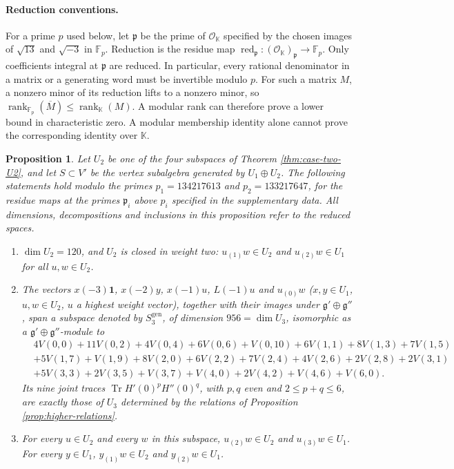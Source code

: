 \documentclass[leqno]{article}
\newcommand{\K}{\ensuremath{\mathbb{K}}}
\renewcommand{\leq}{\ensuremath{\leqslant}}
\newcommand{\co}{\colon}
\newtheorem{prop}[thm]{Proposition}
\numberwithin{equation}{section}
\begin{document}
\paragraph{Reduction conventions.}
For a prime $p$ used below, let $\mathfrak p$ be the prime of $\mathcal O_{\K}$ specified by the chosen images of $\sqrt{13}$ and $\sqrt{-3}$ in $\mathbb F_p$. Reduction is the residue map $\operatorname{red}_{\mathfrak p} \co (\mathcal O_{\K})_{\mathfrak p} \to \mathbb F_p$. Only coefficients integral at $\mathfrak p$ are reduced. In particular, every rational denominator in a matrix or a generating word must be invertible modulo $p$. For such a matrix $M$, a nonzero minor of its reduction lifts to a nonzero minor, so $\operatorname{rank}_{\mathbb F_p}(\overline M) \leq \operatorname{rank}_{\K}(M)$. A modular rank can therefore prove a lower bound in characteristic zero. A modular membership identity alone cannot prove the corresponding identity over $\K$.

\begin{prop}
\label{prop:case-two-weight-three}
Let $U_2$ be one of the four subspaces of Theorem \ref{thm:case-two-U2}, and let $S \subset V'$ be the vertex subalgebra generated by $U_1 \oplus U_2$. The following statements hold modulo the primes $p_1 = 134217613$ and $p_2 = 133217647$, for the residue maps at the primes $\mathfrak p_i$ above $p_i$ specified in the supplementary data. All dimensions, decompositions and inclusions in this proposition refer to the reduced spaces.
\begin{enumerate}
\item $\dim U_2 = 120$, and $U_2$ is closed in weight two: $u_{(1)}w \in U_2$ and $u_{(2)}w \in U_1$ for all $u,w \in U_2$.
\item The vectors $x(-3)\mathbf 1$, $x(-2)y$, $x(-1)u$, $L(-1)u$ and $u_{(0)}w$ ($x,y \in U_1$, $u,w \in U_2$, $u$ a highest weight vector), together with their images under $\mathfrak g' \oplus \mathfrak g''$, span a subspace denoted by $S_3^{\mathrm{gen}}$, of dimension $956 = \dim U_3$, isomorphic as a $\mathfrak g' \oplus \mathfrak g''$-module to
\[
\begin{aligned}
&4V(0,0)+11V(0,2)+4V(0,4)+6V(0,6)+V(0,10)+6V(1,1)+8V(1,3)+7V(1,5)\\
&+5V(1,7)+V(1,9)+8V(2,0)+6V(2,2)+7V(2,4)+4V(2,6)+2V(2,8)+2V(3,1)\\
&+5V(3,3)+2V(3,5)+V(3,7)+V(4,0)+2V(4,2)+V(4,6)+V(6,0).
\end{aligned}
\]
Its nine joint traces $\operatorname{Tr}H'(0)^pH''(0)^q$, with $p,q$ even and $2 \leq p+q \leq 6$, are exactly those of $U_3$ determined by the relations of Proposition \ref{prop:higher-relations}.
\item For every $u \in U_2$ and every $w$ in this subspace, $u_{(2)}w \in U_2$ and $u_{(3)}w \in U_1$. For every $y \in U_1$, $y_{(1)}w \in U_2$ and $y_{(2)}w \in U_1$.
\end{enumerate}
\end{prop}
\end{document}
